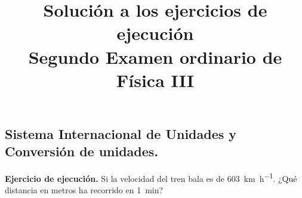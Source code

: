 \documentclass[12pt, letter]{exam}
\date{}
\title{Solución a los ejercicios de ejecución \\ Segundo Examen ordinario de Física III}
\begin{document}
\maketitle

\setcounter{page}{2}

\begin{questions}
    \section{Sistema Internacional de Unidades y Conversión de unidades.}
    \setcounter{question}{1} \question \textbf{Ejercicio de ejecución.} Si la velocidad del tren bala es de \SI{603}{\kilo\meter\per\hour}. ¿Qué distancia en metros ha recorrido en \SI{1}{\minute}?
    

\end{questions}
\end{document}

